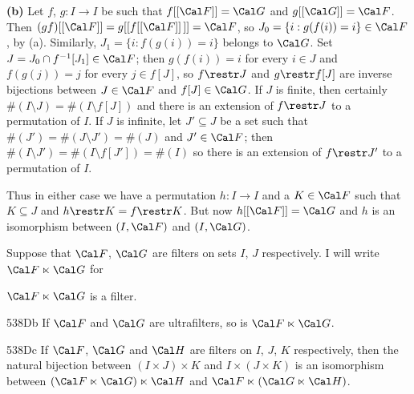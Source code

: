 {\medskip

{\bf (b)} Let $f$, $g:I\to I$ be such that $f[[\Cal F]]=\Cal G$ and
$g[[\Cal G]]=\Cal F$.   Then $(gf)[[\Cal F]]=g[[f[[\Cal F]]\,]]=\Cal F$, so
$J_0=\{i:g(f(i))=i\}\in\Cal F$, by (a).   Similarly, $J_1=\{i:f(g(i))=i\}$
belongs to $\Cal G$.   Set $J=J_0\cap f^{-1}[J_1]\in\Cal F$;
then $g(f(i))=i$ for
every $i\in J$ and $f(g(j))=j$ for every $j\in f[J]$, so $f\restr J$ and
$g\restr f[J]$ are inverse bijections between $J\in\Cal F$ and
$f[J]\in\Cal G$.   If $J$ is finite, then certainly
$\#(I\setminus J)=\#(I\setminus f[J])$ and there is an extension of
$f\restr J$ to a permutation of $I$.   If $J$ is infinite, let
$J'\subseteq J$ be a set such that $\#(J')=\#(J\setminus J')=\#(J)$ and
$J'\in\Cal F$;  then $\#(I\setminus J')=\#(I\setminus f[J'])=\#(I)$
so there is an extension of $f\restr J'$ to a permutation of $I$.

Thus in either case we have a permutation
$h:I\to I$ and a $K\in\Cal F$ such
that $K\subseteq J$ and $h\restr K=f\restr K$.   But now
$h[[\Cal F]]=\Cal G$ and $h$ is an isomorphism between $(I,\Cal F)$ and
$(I,\Cal G)$.
}%

Suppose that $\Cal F$, $\Cal G$ are filters on sets $I$, $J$ respectively.
I will write $\Cal F\ltimes\Cal G$ for


\noindent{}$\Cal F\ltimes\Cal G$
is a filter.

\spheader 538Db
If $\Cal F$ and $\Cal G$ are ultrafilters, so is $\Cal F\ltimes\Cal G$.

\spheader 538Dc If $\Cal F$, $\Cal G$ and $\Cal H$ are filters on $I$,
$J$, $K$ respectively, then the natural bijection between
$(I\times J)\times K$ and $I\times(J\times K)$ is an isomorphism between
$(\Cal F\ltimes\Cal G)\ltimes\Cal H$ and
$\Cal F\ltimes(\Cal G\ltimes\Cal H)$.   

